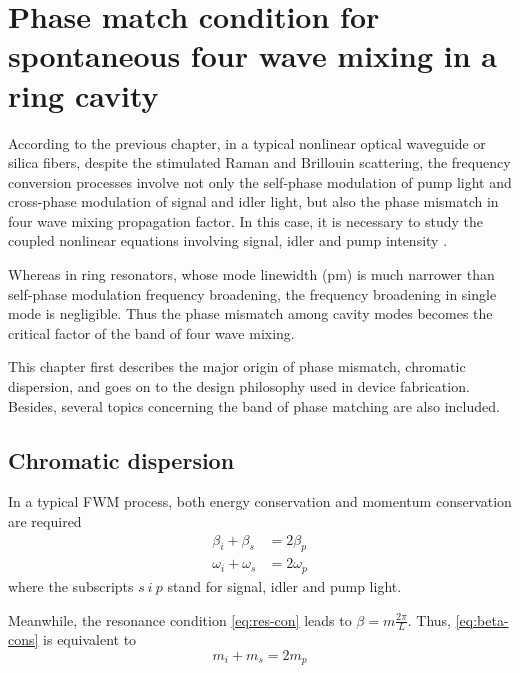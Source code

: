 
\chapter{Phase match condition for spontaneous four wave mixing in a ring cavity }\label{chap:pmc-sfwm}

According to the previous chapter, in a typical nonlinear optical waveguide or silica fibers, despite the stimulated Raman and Brillouin scattering, the frequency conversion processes involve not only the self-phase modulation of pump light and cross-phase modulation of signal and idler light, but also the phase mismatch in four wave mixing propagation factor. 
In this case, it is necessary to study the coupled nonlinear equations involving signal, idler and pump intensity \cite{AGRAWAL2013397}. 

Whereas in ring resonators, whose mode linewidth (pm) is much narrower than self-phase modulation frequency broadening, 
the frequency broadening in single mode is negligible. 
Thus the phase mismatch among cavity modes becomes the critical factor of the band of four wave mixing.

This chapter first describes the major origin of phase mismatch, chromatic dispersion, and goes on to the design philosophy used in device fabrication. Besides, several topics concerning the band of phase matching are also included.

\section{Chromatic dispersion}

In a typical FWM process, both energy conservation and momentum conservation are required 
\begin{align}
  \beta_i + \beta_s & = 2 \beta_p \label{eq:beta-cons} \\
  \omega_i + \omega_s & = 2 \omega_p \label{eq:omega-cons}
\end{align}
where the subscripts $s~i~p$ stand for signal, idler and pump light.

Meanwhile, the resonance condition \autoref{eq:res-con} leads to $\beta = m \frac{2 \pi}{L}$. Thus, \autoref{eq:beta-cons} is equivalent to 
\begin{equation}\label{eq:mu-cons}
  m_i + m_s = 2 m_p 
\end{equation} 
  
